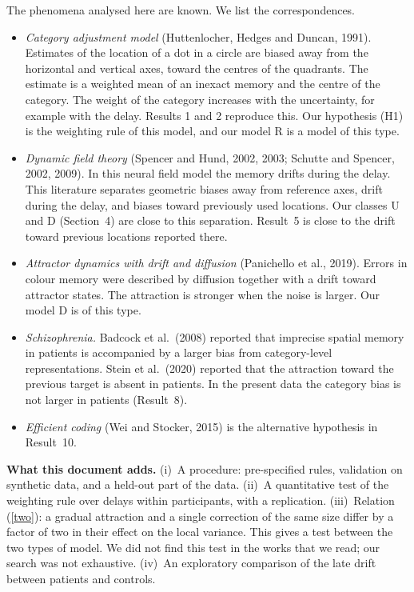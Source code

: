 \documentclass[10pt,a4paper]{article}
\begin{document}
The phenomena analysed here are known. We list the correspondences.
\begin{itemize}
\item \emph{Category adjustment model} (Huttenlocher, Hedges and Duncan, 1991). Estimates of the location of a
dot in a circle are biased away from the horizontal and vertical axes, toward the centres of the quadrants.
The estimate is a weighted mean of an inexact memory and the centre of the category. The weight of the category
increases with the uncertainty, for example with the delay. Results 1 and 2 reproduce this. Our hypothesis (H1)
is the weighting rule of this model, and our model R is a model of this type.
\item \emph{Dynamic field theory} (Spencer and Hund, 2002, 2003; Schutte and Spencer, 2002, 2009). In this
neural field model the memory drifts during the delay. This literature separates geometric biases away from
reference axes, drift during the delay, and biases toward previously used locations. Our classes U and D
(Section~4) are close to this separation. Result~5 is close to the drift toward previous locations reported
there.
\item \emph{Attractor dynamics with drift and diffusion} (Panichello et al., 2019). Errors in colour memory
were described by diffusion together with a drift toward attractor states. The attraction is stronger when
the noise is larger. Our model D is of this type.
\item \emph{Schizophrenia.} Badcock et al.\ (2008) reported that imprecise spatial memory in patients is
accompanied by a larger bias from category-level representations. Stein et al.\ (2020) reported that the
attraction toward the previous target is absent in patients. In the present data the category bias is not
larger in patients (Result~8).
\item \emph{Efficient coding} (Wei and Stocker, 2015) is the alternative hypothesis in Result~10.
\end{itemize}

\textbf{What this document adds.} (i)~A procedure: pre-specified rules, validation on synthetic data, and a
held-out part of the data. (ii)~A quantitative test of the weighting rule over delays within participants,
with a replication. (iii)~Relation (\ref{two}): a gradual attraction and a single correction of the same size
differ by a factor of two in their effect on the local variance. This gives a test between the two types of
model. We did not find this test in the works that we read; our search was not exhaustive. (iv)~An exploratory
comparison of the late drift between patients and controls.
\end{document}
